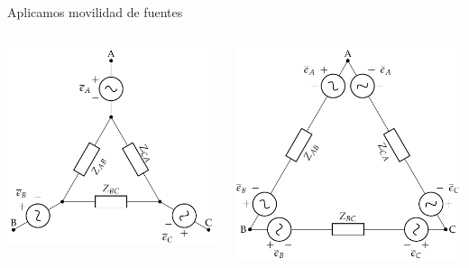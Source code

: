 \documentclass[aspectratio=169, usenames,svgnames,dvipsnames]{beamer}
\begin{document}
\begin{frame}[label={sec:orgb39f55d}]{Aplicamos movilidad de fuentes}
\begin{columns}
\begin{column}{0.4\columnwidth}
\begin{center}
\includegraphics[width=\textwidth]{../figs/GeneradorRealEstrella_ZTriangulo.pdf}
\end{center}
\end{column}
\begin{column}{0.4\columnwidth}
\begin{center}
\includegraphics[width=\textwidth]{../figs/GeneradorRealEstrella_Transformado1.pdf}
\end{center}
\end{column}
\end{columns}
\end{frame}
\end{document}

